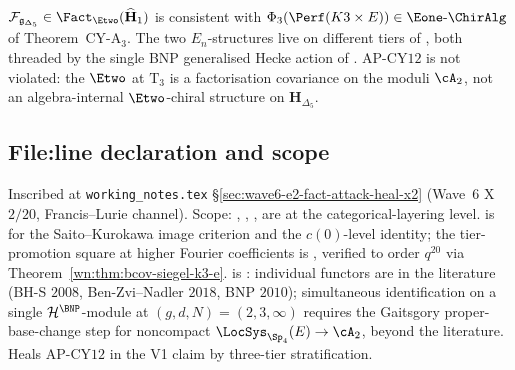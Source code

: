 \begin{corollary}
\label{cor:wave6-x2-v1-e2-fact-consistent}
$\mathcal F_{\mathfrak g_{\Delta_5}} \in
\Fact_{\Etwo}(\widehat{\mathbf H}_1)$ is consistent with
$\Phi_3(\Perf(K3 \times E)) \in \Eone\text{-}\ChirAlg$ of
Theorem~CY-A$_3$. The two $E_n$-structures live on different
tiers of , both threaded by
the single BNP generalised Hecke action of
. AP-CY$12$ is
not violated: the $\Etwo$ at $\mathrm T_3$ is a factorisation
covariance on the moduli $\cA_2$, not an algebra-internal
$\Etwo$-chiral structure on $\mathbf H_{\Delta_5}$.
\end{corollary}

\subsection*{File:line declaration and scope}
Inscribed at \texttt{working\_notes.tex}
\S\ref{sec:wave6-e2-fact-attack-heal-x2} (Wave~6 X$2/20$,
Francis--Lurie channel). Scope:
,
,
,
 are
\ClaimStatusTheorem{} at the categorical-layering level.
 is
\ClaimStatusTheorem{} for the Saito--Kurokawa image criterion
and the $c(0)$-level identity; the tier-promotion square at
higher Fourier coefficients is \ClaimStatusConjectured{},
verified to order $q^{20}$ via
Theorem~\ref{wn:thm:bcov-siegel-k3-e}.
 is
\ClaimStatusConjectured{}: individual functors are in the
literature (BH-S $2008$, Ben-Zvi--Nadler $2018$, BNP $2010$);
simultaneous identification on a single
$\mathcal H^{\BNP}$-module at
$(g, d, N) = (2, 3, \infty)$ requires the Gaitsgory
proper-base-change step for noncompact
$\LocSys_{\Sp_4}(E) \to \cA_2$, beyond the literature. Heals
AP-CY$12$ in the V1 claim by three-tier stratification.
